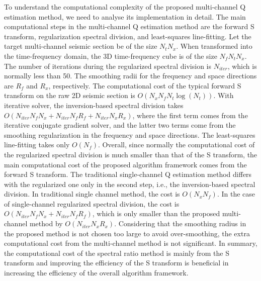 To understand the computational complexity of the proposed multi-channel Q estimation method, we need to analyse its implementation in detail. The main computational steps in the multi-channel Q estimation method are the forward S transform, regularization spectral division, and least-squares line-fitting. Let the target multi-channel seismic section be of the size $N_tN_x$. When transformed into the time-frequency domain, the 3D time-frequency cube is of the size $N_fN_tN_x$. The number of iterations during the regularized spectral division is $N_{iter}$, which is normally less than 50. The smoothing radii for the frequency and space directions are $R_f$ and $R_x$, respectively. The computational cost of the typical forward S transform on the raw 2D seismic section is $O(N_xN_fN_t\log(N_t))$. With iterative solver, the inversion-based spectral division takes $O(N_{iter}N_fN_x+N_{iter}N_fR_f+N_{iter}N_xR_x)$, where the first term comes from the iterative conjugate gradient solver, and the latter two terms come from the smoothing regularization in the frequency and space directions. The least-squares line-fitting takes only $O(N_f)$. Overall, since normally the computational cost of the regularized spectral division is much smaller than that of the S transform, the main computational cost of the proposed algorithm framework comes from the forward S transform. The traditional single-channel Q estimation method differs with the regularized one only in the second step, i.e., the inversion-based spectral division. In traditional single channel method, the cost is $O(N_xN_f)$. In the case of single-channel regularized spectral division, the cost is $O(N_{iter}N_fN_x+N_{iter}N_fR_f)$, which is only smaller than the proposed multi-channel method by $O(N_{iter}N_xR_x)$. Considering that the smoothing radius in the proposed method is not chosen too large to avoid over-smoothing, the extra computational cost from the multi-channel method is not significant. In summary, the computational cost of the spectral ratio method is mainly from the S transform and improving the efficiency of the S transform is beneficial in increasing the efficiency of the overall algorithm framework.








